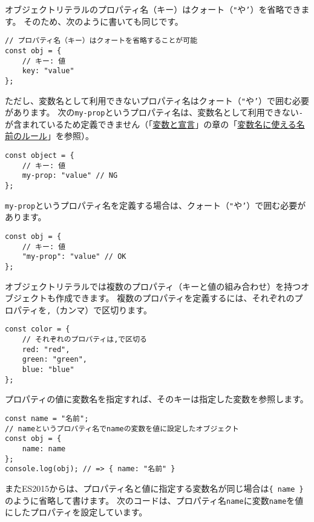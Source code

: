 オブジェクトリテラルのプロパティ名（キー）はクォート（\texttt{"}や\texttt{'}）を省略できます。
そのため、次のように書いても同じです。

\begin{lstlisting}
// プロパティ名（キー）はクォートを省略することが可能
const obj = {
    // キー: 値
    key: "value"
};
\end{lstlisting}

ただし、変数名として利用できないプロパティ名はクォート（\texttt{"}や\texttt{'}）で囲む必要があります。
次の\texttt{my-prop}というプロパティ名は、変数名として利用できない\texttt{-}が含まれているため定義できません（「\hyperlink{variable-and-declaration}{変数と宣言}」の章の「\hyperlink{variable-name}{変数名に使える名前のルール}」を参照）。

\begin{lstlisting}
const object = {
    // キー: 値
    my-prop: "value" // NG
};
\end{lstlisting}

\texttt{my-prop}というプロパティ名を定義する場合は、クォート（\texttt{"}や\texttt{'}）で囲む必要があります。

\begin{lstlisting}
const obj = {
    // キー: 値
    "my-prop": "value" // OK
};
\end{lstlisting}

オブジェクトリテラルでは複数のプロパティ（キーと値の組み合わせ）を持つオブジェクトも作成できます。
複数のプロパティを定義するには、それぞれのプロパティを\texttt{,}（カンマ）で区切ります。

\begin{lstlisting}
const color = {
    // それぞれのプロパティは,で区切る
    red: "red",
    green: "green",
    blue: "blue"
};
\end{lstlisting}

プロパティの値に変数名を指定すれば、そのキーは指定した変数を参照します。

\begin{lstlisting}
const name = "名前";
// nameというプロパティ名でnameの変数を値に設定したオブジェクト
const obj = {
    name: name
};
console.log(obj); // => { name: "名前" }
\end{lstlisting}

またES2015からは、プロパティ名と値に指定する変数名が同じ場合は\texttt{\{ name \}}のように省略して書けます。
次のコードは、プロパティ名\texttt{name}に変数\texttt{name}を値にしたプロパティを設定しています。

